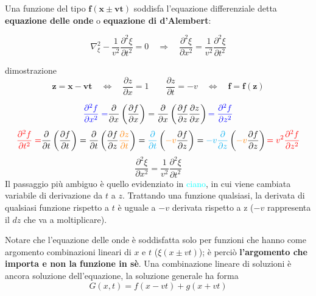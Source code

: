 \documentclass[x11names]{article}
\begin{document}
	Una funzione del tipo \(\mathbf{f(x \pm vt)}\) soddisfa l'equazione differenziale detta \textbf{equazione delle onde} o \textbf{equazione di d'Alembert}:
	
	\[ 
	\nabla^2_\xi- \frac{1}{v^2} \frac{\partial^2\xi}{\partial t^2} = 0 \quad \Rightarrow \quad \boxed{\frac{\partial^2\xi}{\partial x^2} = \frac{1}{v^2}\frac{\partial^2\xi}{\partial t^2}}
	\]
	
	\begin{es}{dimostrazione}
		\[ 
		\mathbf{z = x - vt} \quad \Longleftrightarrow \quad \boxed{\frac{\partial z}{\partial x} = 1}   \quad \quad \boxed{\frac{\partial z}{\partial t} = -v}  \quad \Longleftrightarrow \quad  \mathbf{f = f(z)}
		\]
		
		\[ 
		\textcolor{blue}{\frac{\partial^2 f}{\partial x^2} =} \frac{\partial}{\partial x}\left(\frac{\partial f}{\partial x}\right) =\frac{\partial}{\partial x}\left(\frac{\partial f}{\partial z}\frac{\partial z}{\partial x}\right)  \textcolor{blue}{=\frac{\partial^2 f}{\partial z^2}}
		\]
		\[ 
		\textcolor{red}{\frac{\partial^2 f}{\partial t^2} =} \frac{\partial}{\partial t}\left(\frac{\partial f}{\partial t}\right) =\frac{\partial}{\partial t}\left(\frac{\partial f}{\partial z}\textcolor{orange}{\frac{\partial z}{\partial t}}\right) =\textcolor{cyan}{\frac{\partial}{\partial t}}\left(\textcolor{orange}{-v}\frac{\partial f}{\partial z}\right) = \textcolor{cyan}{-v\frac{\partial }{\partial z}}\left(\textcolor{orange}{-v}\frac{\partial f}{\partial z}\right) \textcolor{red}{=v^2\frac{\partial^2 f}{\partial z^2}}
		\]
		\[ 
	    \frac{\partial^2\xi}{\partial x^2} = \frac{1}{v^2}\frac{\partial^2\xi}{\partial t^2}
		\]
		\newline
		Il passaggio più ambiguo è quello evidenziato in \textcolor{cyan}{ciano}, in cui viene cambiata variabile di derivazione da \(t\) a \(z\). Trattando una funzione qualsiasi, la derivata di qualsiasi funzione rispetto a \(t\) è uguale a \(-v\) derivata rispetto a z (\(-v\) rappresenta il \(dz\) che va a moltiplicare). 
	\end{es}	
	
	\noindent
	Notare che l'equazione delle onde è soddisfatta solo per funzioni che hanno come argomento combinazioni lineari di \(x\) e \(t\) (\(\xi(x \pm vt)\)); è perciò \textbf{l'argomento che importa e non la funzione in sè}. Una combinazione lineare di soluzioni è ancora soluzione dell'equazione, la soluzione generale ha forma
	\[ 
	G(x,t) = f(x-vt) + g(x+vt)
	\]
	
\end{document}
